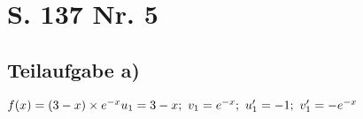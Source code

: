 \documentclass[11pt, a4paper]{report}
\begin{document}
	\chapter{S. 137 Nr. 5}
	\section{Teilaufgabe a)}
	$
	f(x) = (3 - x) \times e^{-x} \\
	u_1 = 3 - x;\ v_1 = e^{-x};\ u_1' = -1;\ v_1' = -e^{-x}\\\\
	$
\end{document}
